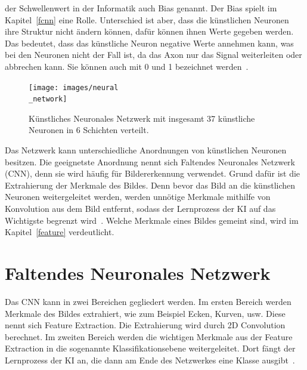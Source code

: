\documentclass[11pt]{article}
\begin{document}
der Schwellenwert in der Informatik auch Bias genannt. Der Bias spielt im Kapitel~\ref{fcnn} eine Rolle. Unterschied ist aber,
dass die künstlichen Neuronen ihre Struktur nicht ändern können, dafür können ihnen Werte gegeben werden. Das bedeutet, dass das künstliche Neuron
negative Werte annehmen kann, was bei den Neuronen nicht der Fall ist, da das Axon nur das Signal weiterleiten oder abbrechen kann. Sie können auch mit 0 und 1 bezeichnet werden~\cite{5}.
\begin{figure}[h]
    \centering
    \texttt{[image: images/neural\\\_network]}
    \caption[Künstliches Neuronales Netzwerk]{Künstliches Neuronales Netzwerk mit insgesamt 37 künstliche Neuronen in 6 Schichten verteilt.}\label{fnnpic}
\end{figure}
Das Netzwerk kann unterschiedliche Anordnungen von künstlichen Neuronen besitzen. Die geeignetste Anordnung nennt sich
Faltendes Neuronales Netzwerk (CNN), denn sie wird häufig für Bildererkennung verwendet. Grund dafür ist die Extrahierung der Merkmale
des Bildes. Denn bevor das Bild an die künstlichen Neuronen weitergeleitet werden, werden unnötige Merkmale mithilfe von Konvolution aus dem Bild entfernt, sodass der
Lernprozess der KI auf das Wichtigste begrenzt wird~\cite{12}. Welche Merkmale eines Bildes gemeint sind, wird im Kapitel~\ref{feature} verdeutlicht.

\section{Faltendes Neuronales Netzwerk}

Das CNN kann in zwei Bereichen gegliedert werden. Im ersten Bereich werden Merkmale des Bildes extrahiert, wie zum Beispiel Ecken, Kurven, usw. Diese nennt sich Feature Extraction.
Die Extrahierung wird durch 2D Convolution berechnet. Im zweiten Bereich werden die
wichtigen Merkmale aus der Feature Extraction in die sogenannte Klassifikationsebene weitergeleitet. Dort fängt der Lernprozess
der KI an, die dann am Ende des Netzwerkes eine Klasse ausgibt~\cite{12}.
\end{document}
